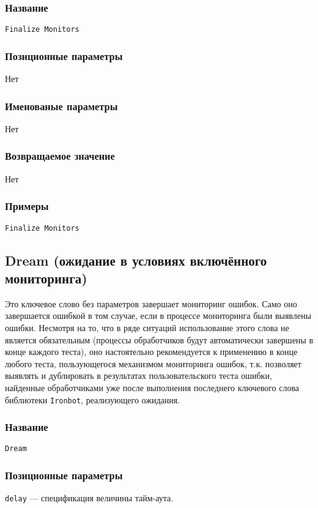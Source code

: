 \documentclass[11pt]{book} %
\begin{document}
\subsubsection*{Название} 
\verb"Finalize Monitors"

\subsubsection*{Позиционные параметры} 
Нет

\subsubsection*{Именованые параметры} 
Нет

\subsubsection*{Возвращаемое значение} 
Нет

\subsubsection*{Примеры}
\begin{verbatim}Finalize Monitors\end{verbatim}




\subsection{Dream (ожидание в условиях включённого мониторинга)}
    Это ключевое слово без параметров завершает мониторинг ошибок. Само оно завершается ошибкой в том случае, если в процессе мониторинга были выявлены ошибки. Несмотря на то, что в ряде ситуаций использование этого слова не является обязательным (процессы обработчиков будут автоматически завершены в конце каждого теста), оно настоятельно рекомендуется к применению в конце любого теста, пользующегося механизмом мониторинга ошибок, т.к. позволяет выявлять и дублировать в результатах пользовательского теста ошибки, найденные обработчиками уже после выполнения последнего ключевого слова библиотеки \verb|Ironbot|, реализующего ожидания.

\subsubsection*{Название} 
\verb"Dream"

\subsubsection*{Позиционные параметры} 
\verb|delay| --- спецификация величины тайм-аута.
\end{document}
